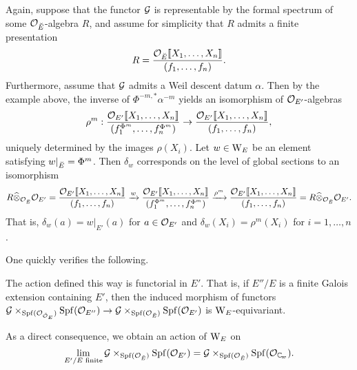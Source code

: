 \documentclass[../main.tex]{subfiles}
\begin{document}
\begin{xpl}
  Again, suppose that the functor 
  $\mathcal{G}$ is representable by the formal spectrum of some $\mathcal{O}_{{\breve {E}}}$-algebra $R$,
  and assume for simplicity that $R$ admits a finite presentation
  \begin{equation*}
    R = \frac{\mathcal{O}_{\breve {E}} \llbracket X_1, \dots, X_n\rrbracket}{(f_1, \dots, f_n)}.
  \end{equation*}
  Furthermore, assume that $\mathcal{G}$ admits a Weil descent datum $\alpha$. 
  Then by the example above, the inverse of $\Phi^{-m, *} \alpha^{-m}$
  yields an isomorphism of $\mathcal{O}_{{E'}}$-algebras
  \begin{equation*}
    \rho^m: \frac{\mathcal{O}_{{E'}} \llbracket X_1, \dots, X_n\rrbracket}{(f_1^{\Phi^m},
    \dots, f_n^{\Phi^m})} \to 
    \frac{\mathcal{O}_{{E'}} \llbracket X_1, \dots, X_n\rrbracket}{(f_1, \dots, f_n)},
  \end{equation*}
  uniquely determined by the images $\rho(X_i)$. 
  Let $w \in \mathrm W_E$ be an element satisfying $w|_{{\breve {E}}} = \Phi^{m}$.
  Then $\delta_w$ corresponds on the level of global sections to an isomorphism
  \begin{equation*}
    R \widehat \otimes_{\mathcal{O}_{\breve {E}}} \mathcal{O}_{{E'}} = 
    \frac{\mathcal{O}_{{E'}} \llbracket X_1, \dots,
    X_n\rrbracket}{(f_1, \dots, f_n)} \xrightarrow{w}  \frac{\mathcal{O}_{{E'}} \llbracket X_1, \dots,
        X_n\rrbracket}{(f_1^{\Phi^m}, \dots, f_n^{\Phi^m})} \xrightarrow{\rho^m}
        \frac{\mathcal{O}_{{E'}} \llbracket X_1, \dots, X_n\rrbracket}{(f_1, \dots, f_n)} = R
        \widehat \otimes_{\mathcal{O}_{\breve {E}}} {\mathcal{O}_{{E'}}}.
  \end{equation*}
  That is, $\delta_w(a) = w|_{E'}(a)$ for $a \in \mathcal{O}_{{E'}}$ and $\delta_w(X_i) =
  \rho^m(X_i)$ for $i= 1, \dots, n$.  
  \end{xpl}

One quickly verifies the following.

\begin{lem}\label{lem:WeilGroupActionIsFunctorialInE}
  The action defined this way is functorial in $E'$. That is, if $E''/E$ is a
  finite Galois extension containing $E'$, then the induced morphism 
  of functors 
  $\mathcal{G} \times_{\operatorname{Spf}(\mathcal{O}_{{\breve {\mathcal{O}}}_E})} \operatorname{Spf}(\mathcal{O}_{E''}) \to 
  \mathcal{G} \times_{\operatorname{Spf}(\mathcal{O}_{\breve {E}})} \operatorname{Spf}(\mathcal{O}_{E'})$
  is $\mathrm W_E$-equivariant. 
\end{lem}
As a direct consequence, we obtain an action of $\mathrm W_E$ on
$$\lim_{E'/E \text{ finite}} \cG \times_{\spf(\cO_\br E)} \spf(\cO_{E'}) = 
\cG \times_{\spf(\cO_\br E)} \spf(\cO_{\Cp}).$$
\end{document}
